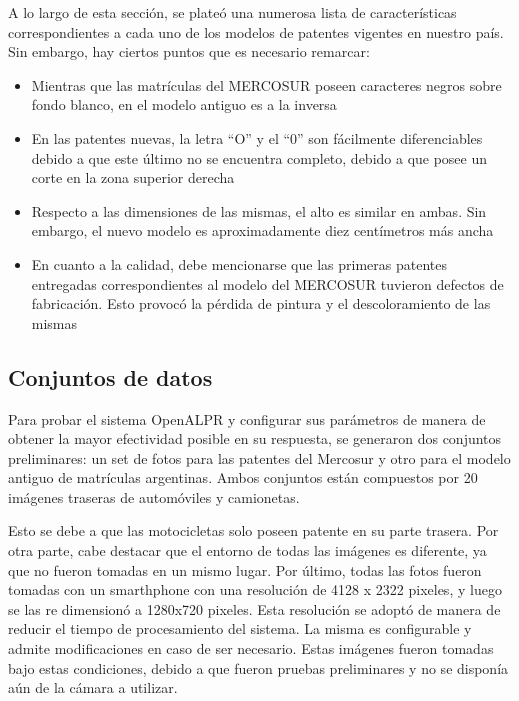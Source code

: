 A lo largo de esta sección, se plateó una numerosa lista de características correspondientes a cada uno de los modelos de patentes vigentes en nuestro país. Sin embargo, hay ciertos puntos que es necesario remarcar:
\begin{itemize}
	\item Mientras que las matrículas del MERCOSUR poseen caracteres negros sobre fondo blanco, en el modelo antiguo es a la inversa
	\item En las patentes nuevas, la letra “O” y el “0” son fácilmente diferenciables debido a que este último no se encuentra completo, debido a que posee un corte en la zona superior derecha 
	\item Respecto a las dimensiones de las mismas, el alto es similar en ambas. Sin embargo, el nuevo modelo es aproximadamente diez centímetros más ancha
	\item En cuanto a la calidad, debe mencionarse que las primeras patentes entregadas correspondientes al modelo del MERCOSUR tuvieron defectos de fabricación. Esto provocó la pérdida de pintura y el descoloramiento de las mismas \cite{fallaspat}
\end{itemize}


\subsection{Conjuntos de datos} \label{key:conjdatos}

Para probar el sistema OpenALPR y configurar sus parámetros de manera de obtener la mayor efectividad posible en su respuesta, se generaron dos conjuntos preliminares: un set de fotos para las patentes del Mercosur y otro para el modelo antiguo de matrículas argentinas. Ambos conjuntos están compuestos por 20 imágenes traseras de automóviles y camionetas. 

Esto se debe a que las motocicletas solo poseen patente en su parte trasera. Por otra parte, cabe destacar que el entorno de todas las imágenes es diferente, ya que no fueron tomadas en un mismo lugar. Por último, todas las fotos fueron tomadas con un smarthphone con una resolución de 4128 x 2322 pixeles, y luego se las re dimensionó a 1280x720 pixeles. Esta resolución se adoptó de manera de reducir el tiempo de procesamiento del sistema. La misma es configurable y admite modificaciones en caso de ser necesario. Estas imágenes fueron tomadas bajo estas condiciones, debido a que fueron pruebas preliminares y no se disponía aún de la cámara a utilizar.

